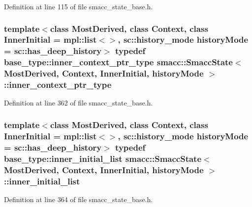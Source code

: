 Definition at line 115 of file smacc\+\_\+state\+\_\+base.\+h.

\subsubsection[{\texorpdfstring{inner\+\_\+context\+\_\+ptr\+\_\+type}{inner_context_ptr_type}}]{\setlength{\rightskip}{0pt plus 5cm}template$<$class Most\+Derived, class Context, class Inner\+Initial = mpl\+::list$<$$>$, sc\+::history\+\_\+mode history\+Mode = sc\+::has\+\_\+deep\+\_\+history$>$ typedef base\+\_\+type\+::inner\+\_\+context\+\_\+ptr\+\_\+type {\bf smacc\+::\+Smacc\+State}$<$ Most\+Derived, Context, Inner\+Initial, history\+Mode $>$\+::{\bf inner\+\_\+context\+\_\+ptr\+\_\+type}}\hypertarget{classsmacc_1_1SmaccState_a65a772c2e2039e9a59148ba6ffb54d8a}{}\label{classsmacc_1_1SmaccState_a65a772c2e2039e9a59148ba6ffb54d8a}


Definition at line 362 of file smacc\+\_\+state\+\_\+base.\+h.

\subsubsection[{\texorpdfstring{inner\+\_\+initial\+\_\+list}{inner_initial_list}}]{\setlength{\rightskip}{0pt plus 5cm}template$<$class Most\+Derived, class Context, class Inner\+Initial = mpl\+::list$<$$>$, sc\+::history\+\_\+mode history\+Mode = sc\+::has\+\_\+deep\+\_\+history$>$ typedef base\+\_\+type\+::inner\+\_\+initial\+\_\+list {\bf smacc\+::\+Smacc\+State}$<$ Most\+Derived, Context, Inner\+Initial, history\+Mode $>$\+::{\bf inner\+\_\+initial\+\_\+list}}\hypertarget{classsmacc_1_1SmaccState_acb4ac84bce421d39b594510a6b2df558}{}\label{classsmacc_1_1SmaccState_acb4ac84bce421d39b594510a6b2df558}


Definition at line 364 of file smacc\+\_\+state\+\_\+base.\+h.

